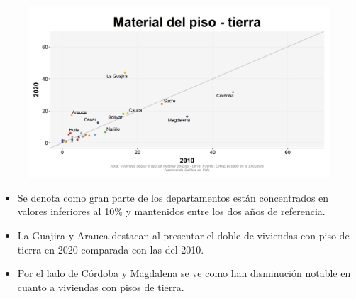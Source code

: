     \begin{figure}[H]
        \caption[Viviendas con piso de tierra por departamentos - 2010 VS 2020 ]{\label{piso_tierra_dptos_vs} }
        \begin{center}
        \includegraphics[width=\textwidth,keepaspectratio]{img/var_179_scatter_time.png}
        \end{center}
    \end{figure}
            \begin{itemize}
                    \item Se denota como gran parte de los departamentos están concentrados en valores inferiores al 10\% y mantenidos entre los dos años de referencia. 
                    \item La Guajira y Arauca destacan al presentar el doble de viviendas con piso de tierra en 2020 comparada con las del 2010.
                    \item Por el lado de Córdoba y Magdalena se ve como han disminución notable en cuanto a viviendas con pisos de tierra.
                    \end{itemize}

